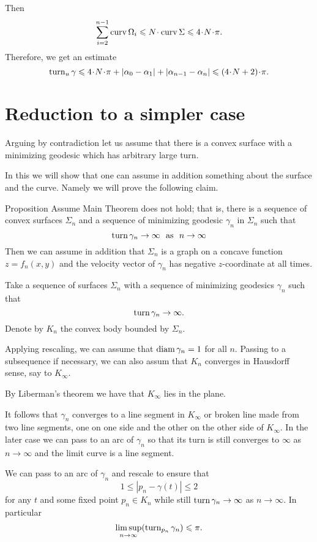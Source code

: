\documentclass[a4paper,10pt]{amsart}
\begin{document}
Then
\[\sum_{i=2}^{n-1}\curv\Omega_i
\le 
N\cdot\curv\Sigma
\le 
4\cdot N\cdot\pi.\]
Therefore, we get an estimate
\[\turn_u\gamma
\le 
4\cdot N\cdot\pi+|\alpha_0-\alpha_1|+|\alpha_{n-1}-\alpha_n|
\le
(4\cdot N+2)\cdot\pi.\]

\section{Reduction to a simpler case}

Arguing by contradiction 
let us assume that 
there is a convex surface with a minimizing geodesic which has arbitrary large turn.

In this we will show that one can assume in addition something about the surface and the curve.
Namely we will prove the following claim.

\begin{thm}{Proposition}
Assume Main Theorem does not hold;
that is, there is a sequence of convex surfaces $\Sigma_n$
and a sequence of minimizing geodesic $\gamma_n$ in $\Sigma_n$ such that 
\[\turn \gamma_n\to\infty\ \ \text{as}\ \ n\to\infty\]
Then we can assume in addition that $\Sigma_n$ is a graph on a concave function 
$z=f_n(x,y)$ and the velocity vector of $\gamma_n$
has negative $z$-coordinate at all times.
\end{thm}

Take a sequence of surfaces $\Sigma_n$ with a sequence of minimizing geodesics $\gamma_n$ such that 
\[\mathop{\rm turn}\nolimits\gamma_n\to \infty.\]
Denote by $K_n$ the convex body bounded by $\Sigma_n$.

Applying rescaling, we can assume that $\operatorname{diam}\gamma_n=1$ for all $n$.
Passing to a subsequence if necessary, we can also assum that $K_n$ converges in Hausdorff sense, say to $K_\infty$.

By Liberman's theorem we have that $K_\infty$ lies in the plane.

It follows that $\gamma_n$ converges to a line segment in $K_\infty$
or broken line made from two line segments, one on one side and the other on the other side of $K_\infty$.
In the later case we can pass to an arc of $\gamma_n$ so that its turn is still converges to $\infty$ as $n\to\infty$ and the limit curve is a line segment.

We can pass to an arc of $\gamma_n$ and rescale to ensure that 
\[1\le|p_n-\gamma(t)|\le 2\] 
for any $t$ and some fixed point $p_n\in K_n$
while still $\mathop{\rm turn}\nolimits\gamma_n\to\infty$ as $n\to \infty$.
In particular 
\[\limsup_{n\to\infty}(\mathop{\rm turn}\nolimits_{p_n}\gamma_n)\leqslant \pi.\]
\end{document}
